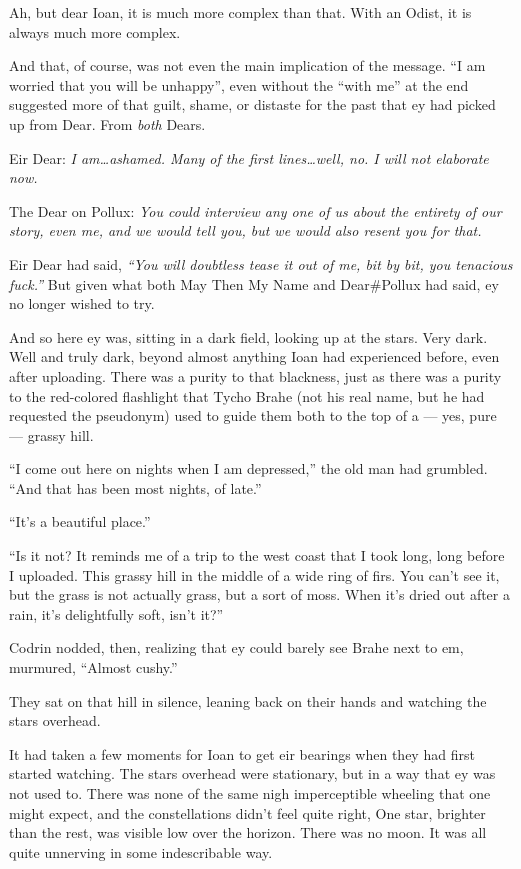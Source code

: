 Ah, but dear Ioan, it is much more complex than that. With an Odist, it is always much more complex.

And that, of course, was not even the main implication of the message. ``I am worried that you will be unhappy'', even without the ``with me'' at the end suggested more of that guilt, shame, or distaste for the past that ey had picked up from Dear. From \emph{both} Dears.

Eir Dear: \emph{I am\ldots ashamed. Many of the first lines\ldots well, no. I will not elaborate now.}

The Dear on Pollux: \emph{You could interview any one of us about the entirety of our story, even me, and we would tell you, but we would also resent you for that.}

Eir Dear had said, \emph{``You will doubtless tease it out of me, bit by bit, you tenacious fuck.''} But given what both May Then My Name and Dear\#Pollux had said, ey no longer wished to try.

And so here ey was, sitting in a dark field, looking up at the stars. Very dark. Well and truly dark, beyond almost anything Ioan had experienced before, even after uploading. There was a purity to that blackness, just as there was a purity to the red-colored flashlight that Tycho Brahe (not his real name, but he had requested the pseudonym) used to guide them both to the top of a — yes, pure — grassy hill.

``I come out here on nights when I am depressed,'' the old man had grumbled. ``And that has been most nights, of late.''

``It's a beautiful place.''

``Is it not? It reminds me of a trip to the west coast that I took long, long before I uploaded. This grassy hill in the middle of a wide ring of firs. You can't see it, but the grass is not actually grass, but a sort of moss. When it's dried out after a rain, it's delightfully soft, isn't it?''

Codrin nodded, then, realizing that ey could barely see Brahe next to em, murmured, ``Almost cushy.''

They sat on that hill in silence, leaning back on their hands and watching the stars overhead.

It had taken a few moments for Ioan to get eir bearings when they had first started watching. The stars overhead were stationary, but in a way that ey was not used to. There was none of the same nigh imperceptible wheeling that one might expect, and the constellations didn't feel quite right, One star, brighter than the rest, was visible low over the horizon. There was no moon. It was all quite unnerving in some indescribable way.

